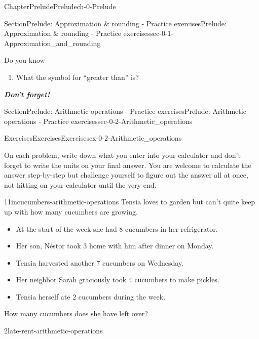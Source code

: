 \documentclass[twoside,11pt,]{book}
\newcommand{\alert}[1]{\textbf{\textit{#1}}}
\numberwithin{equation}{section}
\newcommand{\kbd}[1]{\keys{{#1}}}
\begin{document}
\begin{chapterptx}{Chapter}{Prelude}{}{Prelude}{}{}{ch-0-Prelude}
\begin{sectionptx}{Section}{Prelude: Approximation \& rounding - Practice exercises}{}{Prelude: Approximation \& rounding - Practice exercises}{}{}{sec-0-1-Approximation_and_rounding}
\begin{conclusion}{Do you know \textellipsis{}}
\begin{enumerate}[label={\Alph*.}]
\item{}What the symbol for ``greater than'' is?%
\end{enumerate}
%
\par
\alert{Don't forget!}%
\end{conclusion}%
\end{sectionptx}
%
%
\typeout{************************************************}
\typeout{************************************************}
%
\begin{sectionptx}{Section}{Prelude: Arithmetic operations - Practice exercises}{}{Prelude: Arithmetic operations - Practice exercises}{}{}{sec-0-2-Arithmetic_operations}
%
%
\typeout{************************************************}
\typeout{************************************************}
%
\begin{exercises-subsection-numberless}{Exercises}{Exercises}{}{Exercises}{}{}{ex-0-2-Arithmetic_operations}
\begin{introduction}{}%
On each problem, write down what you enter into your calculator and don't forget to write the units on your final answer. You are welcome to calculate the answer step-by-step but challenge yourself to figure out the answer all at once, not hitting \kbd{=} on your calculator until the very end.%
\end{introduction}%
\begin{divisionexercise}{1}{}{1in}{cucumbers-arithmetic-operations}%
Tensia loves to garden but can't quite keep up with how many cucumbers are growing.%
\par
%
\begin{itemize}[label=\textbullet]
\item{}At the start of the week she had 8 cucumbers in her refrigerator.%
\item{}Her son, Néstor took 3 home with him after dinner on Monday.%
\item{}Tensia harvested another 7 cucumbers on Wednesday.%
\item{}Her neighbor Sarah graciously took 4 cucumbers to make pickles.%
\item{}Tensia herself ate 2 cucumbers during the week.%
\end{itemize}
%
\par
How many cucumbers does she have left over?%
\end{divisionexercise}%
 \begin{divisionexercise}{2}{}{}{late-rent-arithmetic-operations}%

\end{divisionexercise}
\end{exercises-subsection-numberless}
\end{sectionptx}
\end{chapterptx}
\end{document}
